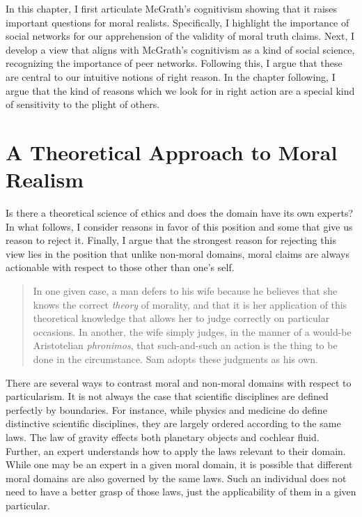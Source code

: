 \documentclass[12pt]{book}
\theoremstyle{definition}
\theoremstyle{remark}
\begin{document}
In this chapter, I first articulate McGrath's cognitivism showing that it raises important questions for moral realists. Specifically, I highlight the importance of social networks for our apprehension of the validity of moral truth claims. Next, I develop a view that aligns with McGrath's cognitivism as a kind of social science, recognizing the importance of peer networks. Following this, I argue that these are central to our intuitive notions of right reason. In the chapter following, I argue that the kind of reasons which we look for in right action are a special kind of sensitivity to the plight of others.

\section{A Theoretical Approach to Moral Realism}\label{a-theoretical-approach-to-moral-realism}

Is there a theoretical science of ethics and does the domain have its own experts? In what follows, I consider reasons in favor of this position and some that give us reason to reject it. Finally, I argue that the strongest reason for rejecting this view lies in the position that unlike non-moral domains, moral claims are always actionable with respect to those other than one's self.

\begin{quote}
In one given case, a man defers to his wife because he believes that she knows the correct \emph{theory} of morality, and that it is her application of this theoretical knowledge that allows her to judge correctly on particular occasions. In another, the wife simply judges, in the manner of a would-be Aristotelian \emph{phronimos}, that such-and-such an action is the thing to be done in the circumstance. Sam adopts these judgments as his own.
\end{quote}

There are several ways to contrast moral and non-moral domains with respect to particularism. It is not always the case that scientific disciplines are defined perfectly by boundaries. For instance, while physics and medicine do define distinctive scientific disciplines, they are largely ordered according to the same laws. The law of gravity effects both planetary objects and cochlear fluid. Further, an expert understands how to apply the laws relevant to their domain. While one may be an expert in a given moral domain, it is possible that different moral domains are also governed by the same laws. Such an individual does not need to have a better grasp of those laws, just the applicability of them in a given particular.
\end{document}
